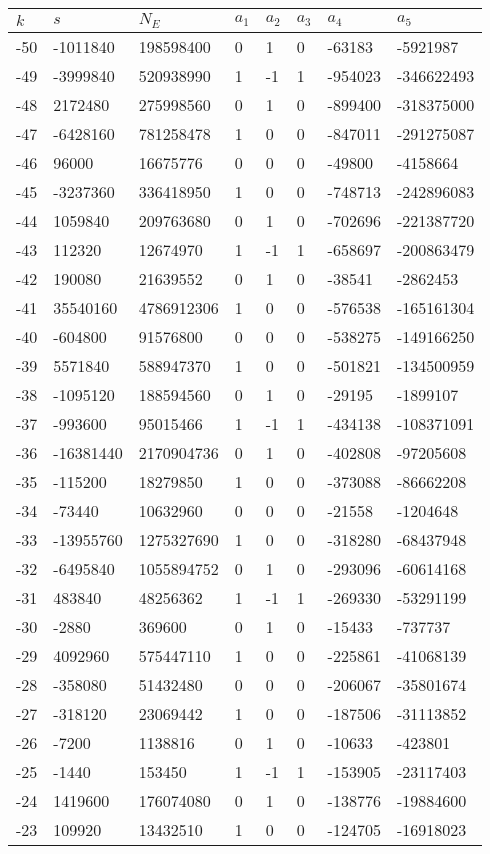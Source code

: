 \documentclass{amsart}
\begin{document}
\begin{longtable}{|l|l|l|lllll|}
\hline
$k$ & $s$ & $N_E$ & $a_1$ & $a_2$ & $a_3$ & $a_4$ & $a_5$\\
\hline
-50&-1011840&198598400&0&1&0&-63183&-5921987\\
-49&-3999840&520938990&1&-1&1&-954023&-346622493\\
-48&2172480&275998560&0&1&0&-899400&-318375000\\
-47&-6428160&781258478&1&0&0&-847011&-291275087\\
-46&96000&16675776&0&0&0&-49800&-4158664\\
-45&-3237360&336418950&1&0&0&-748713&-242896083\\
-44&1059840&209763680&0&1&0&-702696&-221387720\\
-43&112320&12674970&1&-1&1&-658697&-200863479\\
-42&190080&21639552&0&1&0&-38541&-2862453\\
-41&35540160&4786912306&1&0&0&-576538&-165161304\\
-40&-604800&91576800&0&0&0&-538275&-149166250\\
-39&5571840&588947370&1&0&0&-501821&-134500959\\
-38&-1095120&188594560&0&1&0&-29195&-1899107\\
-37&-993600&95015466&1&-1&1&-434138&-108371091\\
-36&-16381440&2170904736&0&1&0&-402808&-97205608\\
-35&-115200&18279850&1&0&0&-373088&-86662208\\
-34&-73440&10632960&0&0&0&-21558&-1204648\\
-33&-13955760&1275327690&1&0&0&-318280&-68437948\\
-32&-6495840&1055894752&0&1&0&-293096&-60614168\\
-31&483840&48256362&1&-1&1&-269330&-53291199\\
-30&-2880&369600&0&1&0&-15433&-737737\\
-29&4092960&575447110&1&0&0&-225861&-41068139\\
-28&-358080&51432480&0&0&0&-206067&-35801674\\
-27&-318120&23069442&1&0&0&-187506&-31113852\\
-26&-7200&1138816&0&1&0&-10633&-423801\\
-25&-1440&153450&1&-1&1&-153905&-23117403\\
-24&1419600&176074080&0&1&0&-138776&-19884600\\
-23&109920&13432510&1&0&0&-124705&-16918023\\

\end{longtable}
\end{document}

